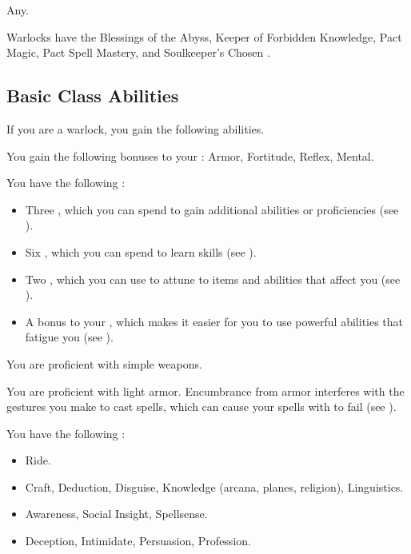      Any.

     Warlocks have the Blessings of the Abyss, Keeper of Forbidden Knowledge, Pact Magic, Pact Spell Mastery, and Soulkeeper's Chosen .

    \subsection{Basic Class Abilities}
        If you are a warlock, you gain the following abilities.

        You gain the following bonuses to your :  Armor,  Fortitude,  Reflex,  Mental.

         You have the following :
        \begin{itemize}
            \item Three , which you can spend to gain additional abilities or proficiencies (see ).
            \item Six , which you can spend to learn skills (see ).
            \item Two , which you can use to attune to items and abilities that affect you (see ).
            \item A  bonus to your , which makes it easier for you to use powerful abilities that fatigue you (see ).
        \end{itemize}

        You are proficient with simple weapons.

        You are proficient with light armor.
        Encumbrance from armor interferes with the gestures you make to cast spells, which can cause your spells with  to fail (see ).

        You have the following :
        \begin{itemize}
            \item {} Ride.
            \item {} Craft, Deduction, Disguise, Knowledge (arcana, planes, religion), Linguistics.
            \item {} Awareness, Social Insight, Spellsense.
            \item {} Deception, Intimidate, Persuasion, Profession.
        \end{itemize}

